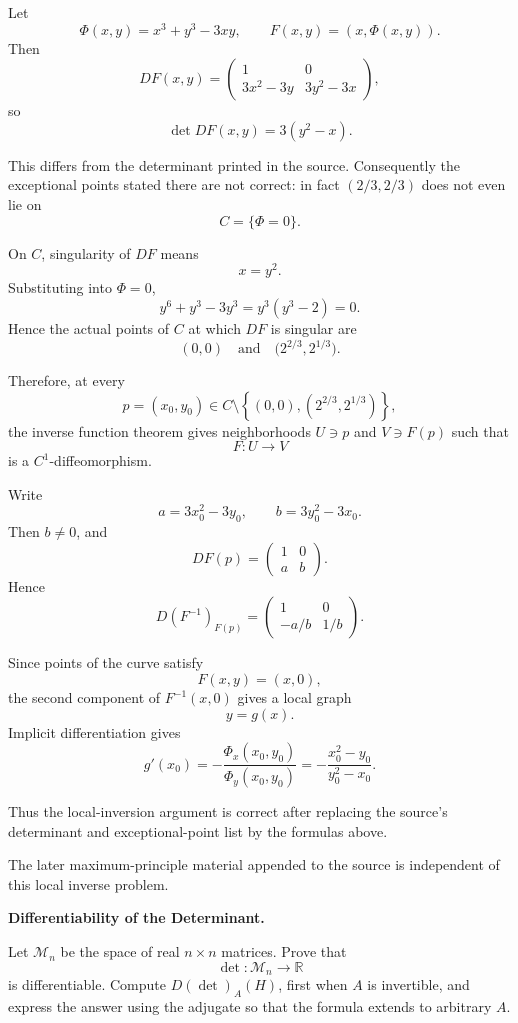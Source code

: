 \begin{solution}
Let
\[
\Phi(x,y)=x^3+y^3-3xy,
\qquad
F(x,y)=(x,\Phi(x,y)).
\]
Then
\[
DF(x,y)
=
\begin{pmatrix}
1&0\\
3x^2-3y&3y^2-3x
\end{pmatrix},
\]
so
\[
\boxed{
\det DF(x,y)=3(y^2-x).
}
\]

This differs from the determinant printed in the source. Consequently the exceptional
points stated there are not correct: in fact \((2/3,2/3)\) does not even lie on
\[
C=\{\Phi=0\}.
\]

On \(C\), singularity of \(DF\) means
\[
x=y^2.
\]
Substituting into \(\Phi=0\),
\[
y^6+y^3-3y^3
=
y^3(y^3-2)=0.
\]
Hence the actual points of \(C\) at which \(DF\) is singular are
\[
\boxed{
(0,0)
\quad\text{and}\quad
\bigl(2^{2/3},2^{1/3}\bigr).
}
\]

Therefore, at every
\[
p=(x_0,y_0)\in
C\setminus
\left\{
(0,0),
(2^{2/3},2^{1/3})
\right\},
\]
the inverse function theorem gives neighborhoods \(U\ni p\) and \(V\ni F(p)\) such that
\[
F:U\to V
\]
is a \(C^1\)-diffeomorphism.

Write
\[
a=3x_0^2-3y_0,
\qquad
b=3y_0^2-3x_0.
\]
Then \(b\neq0\), and
\[
DF(p)
=
\begin{pmatrix}
1&0\\
a&b
\end{pmatrix}.
\]
Hence
\[
\boxed{
D(F^{-1})_{F(p)}
=
\begin{pmatrix}
1&0\\[2pt]
-a/b&1/b
\end{pmatrix}.
}
\]

Since points of the curve satisfy
\[
F(x,y)=(x,0),
\]
the second component of \(F^{-1}(x,0)\) gives a local graph
\[
y=g(x).
\]
Implicit differentiation gives
\[
\boxed{
g'(x_0)
=
-\frac{\Phi_x(x_0,y_0)}{\Phi_y(x_0,y_0)}
=
-\frac{x_0^2-y_0}{y_0^2-x_0}.
}
\]

Thus the local-inversion argument is correct after replacing the source's determinant and
exceptional-point list by the formulas above.

The later maximum-principle material appended to the source is independent of this local
inverse problem.
\end{solution}


\begin{problem}[CP-II-0428]
\label{prob:cp-ii-0428}
\textbf{Differentiability of the Determinant.}

\hspace*{1.5em}Let \(\mathcal M_n\) be the space of real \(n\times n\) matrices. Prove that
\[
\det:\mathcal M_n\to\mathbb R
\]
is differentiable. Compute \(D(\det)_A(H)\), first when \(A\) is invertible,
and express the answer using the adjugate so that the formula extends to
arbitrary \(A\).
\end{problem}

